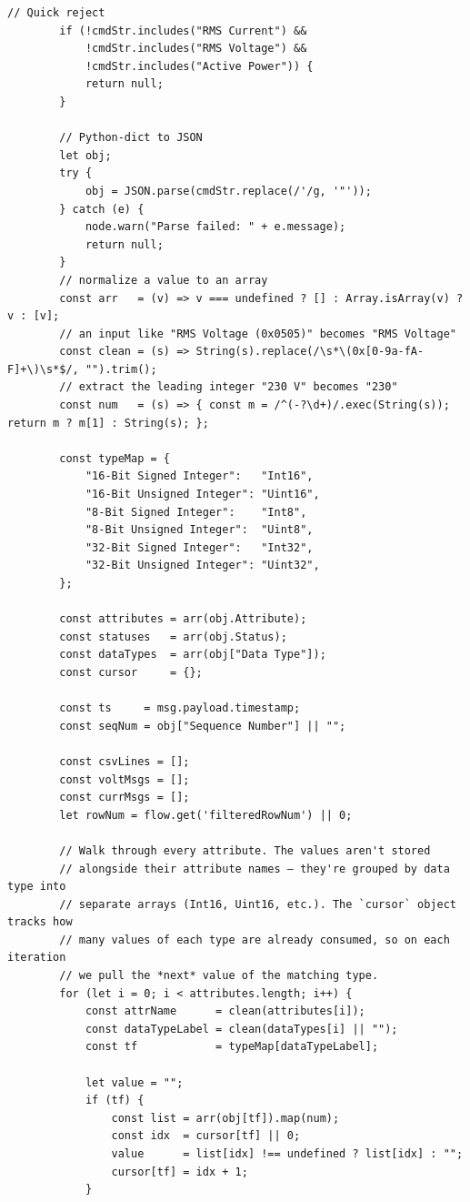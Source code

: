 \begin{description}
\begin{lstlisting}[]
        // Quick reject
        if (!cmdStr.includes("RMS Current") &&
            !cmdStr.includes("RMS Voltage") &&
            !cmdStr.includes("Active Power")) {
            return null;
        }
        
        // Python-dict to JSON
        let obj;
        try {
            obj = JSON.parse(cmdStr.replace(/'/g, '"'));
        } catch (e) {
            node.warn("Parse failed: " + e.message);
            return null;
        }
        // normalize a value to an array
        const arr   = (v) => v === undefined ? [] : Array.isArray(v) ? v : [v];
        // an input like "RMS Voltage (0x0505)" becomes "RMS Voltage"
        const clean = (s) => String(s).replace(/\s*\(0x[0-9a-fA-F]+\)\s*$/, "").trim();
        // extract the leading integer "230 V" becomes "230"
        const num   = (s) => { const m = /^(-?\d+)/.exec(String(s)); return m ? m[1] : String(s); };
        
        const typeMap = {
            "16-Bit Signed Integer":   "Int16",
            "16-Bit Unsigned Integer": "Uint16",
            "8-Bit Signed Integer":    "Int8",
            "8-Bit Unsigned Integer":  "Uint8",
            "32-Bit Signed Integer":   "Int32",
            "32-Bit Unsigned Integer": "Uint32",
        };
        
        const attributes = arr(obj.Attribute);
        const statuses   = arr(obj.Status);
        const dataTypes  = arr(obj["Data Type"]);
        const cursor     = {};
        
        const ts     = msg.payload.timestamp;
        const seqNum = obj["Sequence Number"] || "";
        
        const csvLines = [];
        const voltMsgs = [];
        const currMsgs = [];
        let rowNum = flow.get('filteredRowNum') || 0;
        
        // Walk through every attribute. The values aren't stored
        // alongside their attribute names — they're grouped by data type into
        // separate arrays (Int16, Uint16, etc.). The `cursor` object tracks how
        // many values of each type are already consumed, so on each iteration
        // we pull the *next* value of the matching type.
        for (let i = 0; i < attributes.length; i++) {
            const attrName      = clean(attributes[i]);
            const dataTypeLabel = clean(dataTypes[i] || "");
            const tf            = typeMap[dataTypeLabel];
        
            let value = "";
            if (tf) {
                const list = arr(obj[tf]).map(num);
                const idx  = cursor[tf] || 0;
                value      = list[idx] !== undefined ? list[idx] : "";
                cursor[tf] = idx + 1;
            }
        

\end{lstlisting}
\end{description}
